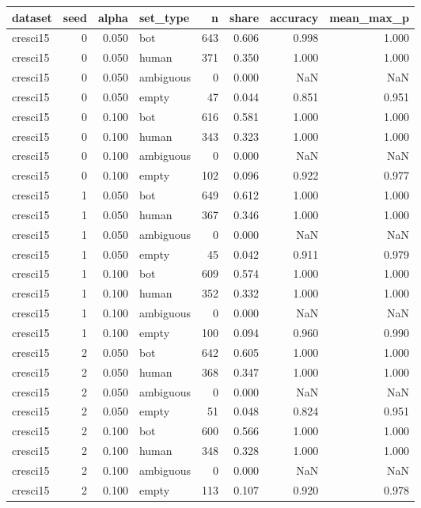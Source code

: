 \begin{tabular}{lrrlrrrr}
\toprule
dataset & seed & alpha & set_type & n & share & accuracy & mean_max_p \\
\midrule
cresci15 & 0 & 0.050 & bot & 643 & 0.606 & 0.998 & 1.000 \\
cresci15 & 0 & 0.050 & human & 371 & 0.350 & 1.000 & 1.000 \\
cresci15 & 0 & 0.050 & ambiguous & 0 & 0.000 & NaN & NaN \\
cresci15 & 0 & 0.050 & empty & 47 & 0.044 & 0.851 & 0.951 \\
cresci15 & 0 & 0.100 & bot & 616 & 0.581 & 1.000 & 1.000 \\
cresci15 & 0 & 0.100 & human & 343 & 0.323 & 1.000 & 1.000 \\
cresci15 & 0 & 0.100 & ambiguous & 0 & 0.000 & NaN & NaN \\
cresci15 & 0 & 0.100 & empty & 102 & 0.096 & 0.922 & 0.977 \\
cresci15 & 1 & 0.050 & bot & 649 & 0.612 & 1.000 & 1.000 \\
cresci15 & 1 & 0.050 & human & 367 & 0.346 & 1.000 & 1.000 \\
cresci15 & 1 & 0.050 & ambiguous & 0 & 0.000 & NaN & NaN \\
cresci15 & 1 & 0.050 & empty & 45 & 0.042 & 0.911 & 0.979 \\
cresci15 & 1 & 0.100 & bot & 609 & 0.574 & 1.000 & 1.000 \\
cresci15 & 1 & 0.100 & human & 352 & 0.332 & 1.000 & 1.000 \\
cresci15 & 1 & 0.100 & ambiguous & 0 & 0.000 & NaN & NaN \\
cresci15 & 1 & 0.100 & empty & 100 & 0.094 & 0.960 & 0.990 \\
cresci15 & 2 & 0.050 & bot & 642 & 0.605 & 1.000 & 1.000 \\
cresci15 & 2 & 0.050 & human & 368 & 0.347 & 1.000 & 1.000 \\
cresci15 & 2 & 0.050 & ambiguous & 0 & 0.000 & NaN & NaN \\
cresci15 & 2 & 0.050 & empty & 51 & 0.048 & 0.824 & 0.951 \\
cresci15 & 2 & 0.100 & bot & 600 & 0.566 & 1.000 & 1.000 \\
cresci15 & 2 & 0.100 & human & 348 & 0.328 & 1.000 & 1.000 \\
cresci15 & 2 & 0.100 & ambiguous & 0 & 0.000 & NaN & NaN \\
cresci15 & 2 & 0.100 & empty & 113 & 0.107 & 0.920 & 0.978 \\

\end{tabular}
